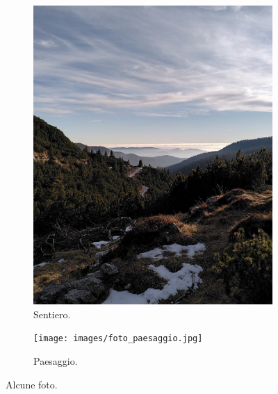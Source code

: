 \documentclass{article}
\begin{document}
\begin{figure}[htbp!]
    \centering
    \begin{subfigure}[b]{0.45\textwidth}
        \includegraphics[width=\textwidth]{images/foto_sentiero.jpg}
        \caption{Sentiero.}
    \end{subfigure}
    \hfill
    \begin{subfigure}[b]{0.45\textwidth}
        \texttt{[image: images/foto\_paesaggio.jpg]}
        \caption{Paesaggio.}
    \end{subfigure}

    \caption{Alcune foto.}
\end{figure}
\end{document}
